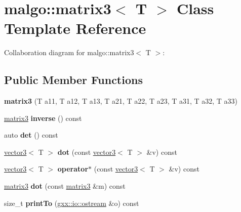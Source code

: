 \hypertarget{classmalgo_1_1matrix3}{}\section{malgo\+:\+:matrix3$<$ T $>$ Class Template Reference}
\label{classmalgo_1_1matrix3}


Collaboration diagram for malgo\+:\+:matrix3$<$ T $>$\+:
\subsection*{Public Member Functions}
\begin{DoxyCompactItemize}
\item 
{\bfseries matrix3} (T a11, T a12, T a13, T a21, T a22, T a23, T a31, T a32, T a33)\hypertarget{classmalgo_1_1matrix3_a30d781a8144ac65e0c1487be8ecdd95b}{}\label{classmalgo_1_1matrix3_a30d781a8144ac65e0c1487be8ecdd95b}

\item 
\hyperlink{classmalgo_1_1matrix3}{matrix3} {\bfseries inverse} () const \hypertarget{classmalgo_1_1matrix3_a45463db8d91e446e31b3efbfab757276}{}\label{classmalgo_1_1matrix3_a45463db8d91e446e31b3efbfab757276}

\item 
auto {\bfseries det} () const \hypertarget{classmalgo_1_1matrix3_a3044304646580ff402a0cd842eb39f67}{}\label{classmalgo_1_1matrix3_a3044304646580ff402a0cd842eb39f67}

\item 
\hyperlink{structmalgo_1_1vector3}{vector3}$<$ T $>$ {\bfseries dot} (const \hyperlink{structmalgo_1_1vector3}{vector3}$<$ T $>$ \&v) const \hypertarget{classmalgo_1_1matrix3_a697c63e3f1719d6d82ef0815367c81f8}{}\label{classmalgo_1_1matrix3_a697c63e3f1719d6d82ef0815367c81f8}

\item 
\hyperlink{structmalgo_1_1vector3}{vector3}$<$ T $>$ {\bfseries operator$\ast$} (const \hyperlink{structmalgo_1_1vector3}{vector3}$<$ T $>$ \&v) const \hypertarget{classmalgo_1_1matrix3_a47b90a7ead39bf6fb503fdafed4040da}{}\label{classmalgo_1_1matrix3_a47b90a7ead39bf6fb503fdafed4040da}

\item 
\hyperlink{classmalgo_1_1matrix3}{matrix3} {\bfseries dot} (const \hyperlink{classmalgo_1_1matrix3}{matrix3} \&m) const \hypertarget{classmalgo_1_1matrix3_ab6594e83d0535367b3290ccb5b587720}{}\label{classmalgo_1_1matrix3_ab6594e83d0535367b3290ccb5b587720}

\item 
size\+\_\+t {\bfseries print\+To} (\hyperlink{classgxx_1_1io_1_1ostream}{gxx\+::io\+::ostream} \&o) const \hypertarget{classmalgo_1_1matrix3_aa4e670b13f89af456bf076a496ba09b4}{}\label{classmalgo_1_1matrix3_aa4e670b13f89af456bf076a496ba09b4}

\end{DoxyCompactItemize}
